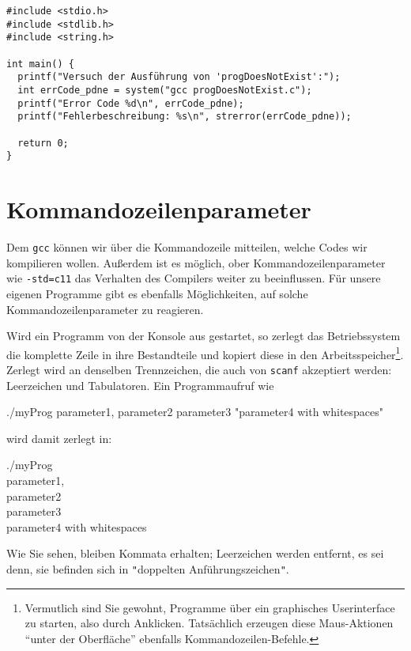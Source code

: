 \begin{codebox}
\begin{verbatim}
#include <stdio.h>
#include <stdlib.h>
#include <string.h>

int main() {
  printf("Versuch der Ausführung von 'progDoesNotExist':");
  int errCode_pdne = system("gcc progDoesNotExist.c");
  printf("Error Code %d\n", errCode_pdne);
  printf("Fehlerbeschreibung: %s\n", strerror(errCode_pdne));

  return 0;
}
\end{verbatim}
\end{codebox}

\section{Kommandozeilenparameter} \label{sec:cmdlineParams}
Dem \texttt{gcc} können wir über die Kommandozeile mitteilen, welche Codes wir kompilieren wollen. Außerdem ist es möglich, ober Kommandozeilenparameter wie \texttt{-std=c11} das Verhalten des Compilers weiter zu beeinflussen. Für unsere eigenen Programme gibt es ebenfalls Möglichkeiten, auf solche Kommandozeilenparameter zu reagieren.

Wird ein Programm von der Konsole aus gestartet, so zerlegt das Betriebssystem die komplette Zeile in ihre Bestandteile und kopiert diese in den Arbeitsspeicher\footnote{Vermutlich sind Sie gewohnt, Programme über ein graphisches Userinterface zu starten, also durch Anklicken. Tatsächlich erzeugen diese Maus-Aktionen \enquote{unter der Oberfläche} ebenfalls Kommandozeilen-Befehle.}. Zerlegt wird an denselben Trennzeichen, die auch von \texttt{scanf} akzeptiert werden: Leerzeichen und Tabulatoren. Ein Programmaufruf wie
\begin{cmdbox}
./myProg parameter1, parameter2        parameter3 "parameter4 with whitespaces"
\end{cmdbox}
wird damit zerlegt in:
\begin{cmdbox}
./myProg\\
parameter1,\\
parameter2 \\
parameter3 \\
parameter4 with whitespaces
\end{cmdbox}

Wie Sie sehen, bleiben Kommata erhalten; Leerzeichen werden entfernt, es sei denn, sie befinden sich in \texttt{"}doppelten Anführungszeichen\texttt{"}.

